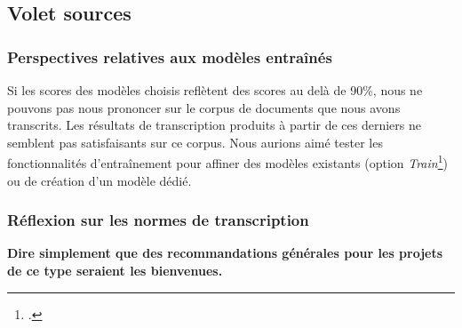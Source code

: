 \documentclass{article}
\begin{document}
	\subsection{Volet sources}
	\subsubsection{Perspectives relatives aux modèles entraînés}
	Si les scores des modèles choisis reflètent des scores au delà de 90\%, nous ne pouvons pas nous prononcer sur le corpus de documents que nous avons transcrits. Les résultats de transcription produits à partir de ces derniers ne semblent pas satisfaisants sur ce corpus. Nous aurions aimé tester les fonctionnalités d'entraînement pour affiner des modèles existants (option \textit{Train}\footcite[au sujet de l'entraînement, voir le point 1.7]{chaguePrendreMainEScriptorium}) ou de création d'un modèle dédié.
	\subsubsection{Réflexion sur les normes de transcription}
	\textbf{Dire simplement que des recommandations générales pour les projets de ce type seraient les bienvenues.}
	
	\printglossaries
	
	\printbibheading
	
	\printbibliography[heading=subbibliography,title=Projets et ressources,keyword=projets]
	
	\printbibliography[heading=subbibliography,title=Notices,keyword=notices]
	
	\printbibliography[heading=subbibliography,title=Études,keyword=autres]
	
\end{document}
